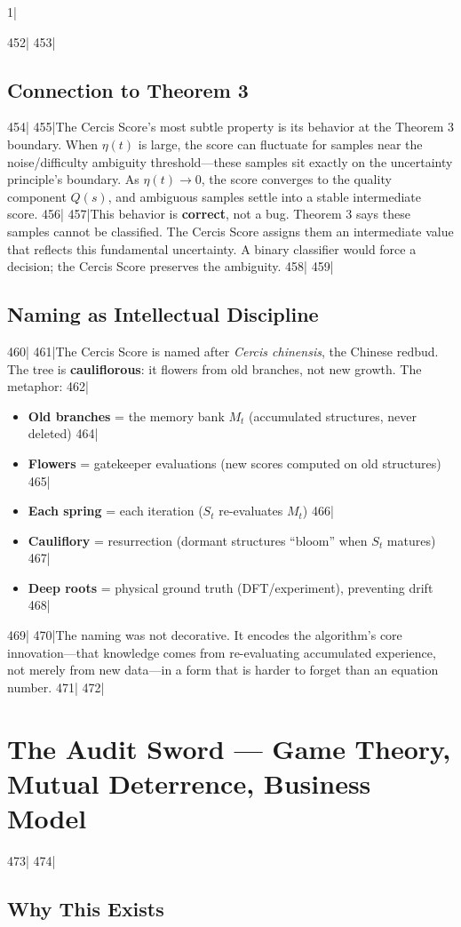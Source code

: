 1|\documentclass[12pt,a4paper]{article}
\begin{document}
452|
453|\subsection{Connection to Theorem 3}
454|
455|The Cercis Score's most subtle property is its behavior at the Theorem 3 boundary. When $\eta(t)$ is large, the score can fluctuate for samples near the noise/difficulty ambiguity threshold—these samples sit exactly on the uncertainty principle's boundary. As $\eta(t) \to 0$, the score converges to the quality component $Q(s)$, and ambiguous samples settle into a stable intermediate score.
456|
457|This behavior is \textbf{correct}, not a bug. Theorem 3 says these samples cannot be classified. The Cercis Score assigns them an intermediate value that reflects this fundamental uncertainty. A binary classifier would force a decision; the Cercis Score preserves the ambiguity.
458|
459|\subsection{Naming as Intellectual Discipline}
460|
461|The Cercis Score is named after \textit{Cercis chinensis}, the Chinese redbud. The tree is \textbf{cauliflorous}: it flowers from old branches, not new growth. The metaphor:
462|\begin{itemize}
463|\item \textbf{Old branches} = the memory bank $M_t$ (accumulated structures, never deleted)
464|\item \textbf{Flowers} = gatekeeper evaluations (new scores computed on old structures)
465|\item \textbf{Each spring} = each iteration ($S_t$ re-evaluates $M_t$)
466|\item \textbf{Cauliflory} = resurrection (dormant structures ``bloom'' when $S_t$ matures)
467|\item \textbf{Deep roots} = physical ground truth (DFT/experiment), preventing drift
468|\end{itemize}
469|
470|The naming was not decorative. It encodes the algorithm's core innovation—that knowledge comes from re-evaluating accumulated experience, not merely from new data—in a form that is harder to forget than an equation number.
471|
472|\section{The Audit Sword — Game Theory, Mutual Deterrence, Business Model}
473|
474|\subsection{Why This Exists}
\end{document}

